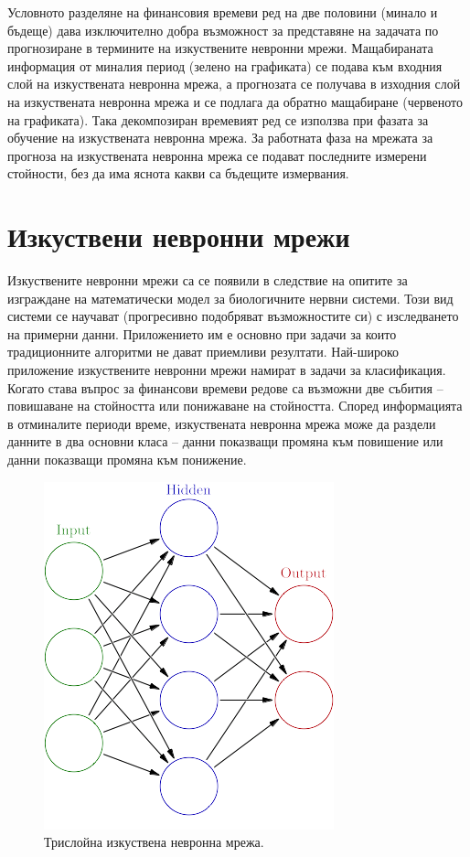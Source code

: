 \documentclass[book,14pt,oneside,openany]{memoir}
\begin{document}
Условното разделяне на финансовия времеви ред на две половини (минало и бъдеще) дава изключително добра възможност за представяне на задачата по прогнозиране в термините на изкуствените невронни мрежи. Мащабираната информация от миналия период (зелено на графиката) се подава към входния слой на изкуствената невронна мрежа, а прогнозата се получава в изходния слой на изкуствената невронна мрежа и се подлага да обратно мащабиране (червеното на графиката). Така декомпозиран времевият ред се използва при фазата за обучение на изкуствената невронна мрежа. За работната фаза на мрежата за прогноза на изкуствената невронна мрежа се подават последните измерени стойности, без да има яснота какви са бъдещите измервания. 

\section{Изкуствени невронни мрежи}

Изкуствените невронни мрежи са се появили в следствие на опитите за изграждане на математически модел за биологичните нервни системи. Този вид системи се научават (прогресивно подобряват възможностите си) с изследването на примерни данни. Приложението им е основно при задачи за които традиционните алгоритми не дават приемливи резултати. Най-широко приложение изкуствените невронни мрежи намират в задачи за класификация. Когато става въпрос за финансови времеви редове са възможни две събития – повишаване на стойността или понижаване на стойността. Според информацията в отминалите периоди време, изкуствената невронна мрежа може да раздели данните в два основни класа – данни показващи промяна към повишение или данни показващи промяна към понижение. 

\begin{figure}[h]
  \centering
  \includegraphics[height=0.25\pdfpageheight]{pic0004}
  \caption{Трислойна изкуствена невронна мрежа.}
\label{fig:pic0004}
\end{figure}
\end{document}
